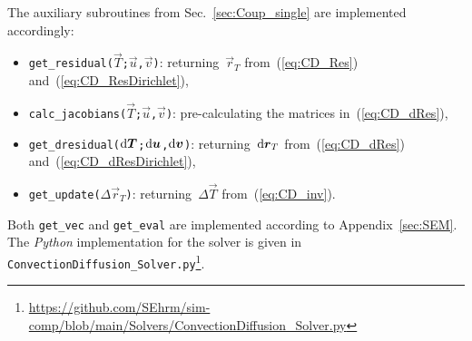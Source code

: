 \documentclass[10pt, ngerman, english,
twoside, open=right,
numbers=noenddot,
declaration=section,
abstract=section,
abstract=multiple,
abstract=notoc,
declaration=notoc,
cd=pale, 
chapterprefix=off, 
chapterpage=false, 
headingsvskip=-10em,
cdgeometry=custom, 
slantedgreek=on,
cdmath=on, 
cdfont=on,
ttfont=false,
mathswap=off,
]{tudscrreprt}
\numberwithin{equation}{chapter}
\newcommand{\sidenote}[1]{
  \leavevmode %
  \marginpar{\hyphenpenalty=1000 \flushleft{\textcolor{HKS41}{#1}}}}
\begin{document}
\sidenote{Implementation}The auxiliary subroutines from Sec.~\ref{sec:Coup_single} are implemented accordingly:
\begin{itemize}
\item \texttt{get\_residual($\vec{T}$;$\vec{u}$,$\vec{v}$)}: returning~$\vec{r}_T$ from~(\ref{eq:CD_Res}) and~(\ref{eq:CD_ResDirichlet}),
\item \texttt{calc\_jacobians($\vec{T}$;$\vec{u}$,$\vec{v}$)}: pre-calculating the matrices in~(\ref{eq:CD_dRes}),
\item \texttt{get\_dresidual($\mathrm{d}\boldsymbol{T}$;$\mathrm{d}\boldsymbol{u}$,$\mathrm{d}\boldsymbol{v}$)}: returning~$\mathrm{d}\boldsymbol{r}_T$ from~(\ref{eq:CD_dRes}) and~(\ref{eq:CD_dResDirichlet}),
\item \texttt{get\_update($\Delta\vec{r}_T$)}: returning~$\Delta\vec{T}$ from~(\ref{eq:CD_inv}).
\end{itemize}
Both \texttt{get\_vec} and \texttt{get\_eval} are implemented according to Appendix~\ref{sec:SEM}. The \textit{Python} implementation for the solver is given in \texttt{ConvectionDiffusion\_Solver.py}\footnote{\url{https://github.com/SEhrm/sim-comp/blob/main/Solvers/ConvectionDiffusion_Solver.py}}.
\end{document}
